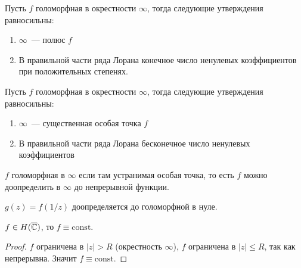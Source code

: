 \begin{observation}
    Пусть $f$ голоморфная в окрестности $\infty$, тогда
    следующие утверждения равносильны:

    \begin{enumerate}
        \item $\infty$~--- полюс $f$
        \item В правильной части ряда Лорана
              конечное число ненулевых коэффициентов при положительных степенях.
    \end{enumerate}
\end{observation}

\begin{observation}
    Пусть $f$ голоморфная в окрестности $\infty$, тогда
    следующие утверждения равносильны:

    \begin{enumerate}
        \item $\infty$~--- существенная особая точка $f$
        \item В правильной части ряда Лорана
              бесконечное число ненулевых коэффициентов
    \end{enumerate}
\end{observation}

\begin{definition}
    $f$ голоморфная в $\infty$ если там устранимая
    особая точка, то есть $f$ можно доопределить
    в $\infty$ до непрерывной функции.
\end{definition}

\begin{observation}
    $g(z) = f(1/z)$ доопределяется до голоморфной в нуле.
\end{observation}

\begin{theorem}[Лиувилль]

    $f \in H(\overline{\mathbb{C}})$, то $f \equiv \mathrm{const}$.
\end{theorem}

\begin{proof}
    $f$ ограничена в $|z| > R$ (окрестность $\infty$),
    $f$ ограничена в $|z| \le R$, так как непрерывна.
    Значит $f \equiv \mathrm{const}$.
\end{proof}

\newpage

